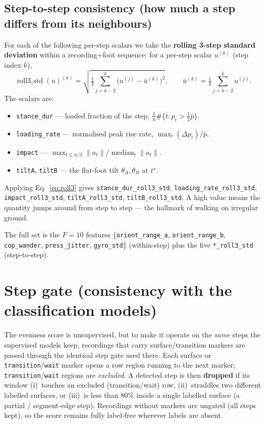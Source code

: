 \documentclass[11pt]{article}
\newcommand{\code}[1]{\texttt{#1}}
\begin{document}
\subsection{Step-to-step consistency (how much a step differs from its neighbours)}
For each of the following per-step scalars we take the \textbf{rolling 3-step standard deviation}
within a recording+foot sequence; for a per-step scalar $u^{(k)}$ (step index $k$),
\begin{equation}
\operatorname{roll3\_std}(u)^{(k)}=\sqrt{\tfrac{1}{3}\textstyle\sum_{j=k-2}^{k}\bigl(u^{(j)}-\bar u^{(k)}\bigr)^2},
\qquad \bar u^{(k)}=\tfrac13\textstyle\sum_{j=k-2}^{k}u^{(j)}.
\label{eq:roll3}
\end{equation}
The scalars are:
\begin{itemize}
  \item \code{stance_dur} --- loaded fraction of the step, $\tfrac1n\#\{t: p_t>\tfrac12\bar p\}$.
  \item \code{loading_rate} --- normalised peak rise rate, $\max_t(\Delta p_t)/\bar p$.
  \item \code{impact} --- $\max_{t\le n/3}\lVert a_t\rVert \big/ \operatorname{median}_t\lVert a_t\rVert$.
  \item \code{tiltA}, \code{tiltB} --- the flat-foot tilt $\theta_A,\theta_B$ at $t^\star$.
\end{itemize}
Applying Eq.~\eqref{eq:roll3} gives \code{stance_dur_roll3_std}, \code{loading_rate_roll3_std},
\code{impact_roll3_std}, \code{tiltA_roll3_std}, \code{tiltB_roll3_std}. A high value means the
quantity jumps around from step to step --- the hallmark of walking on irregular ground.

\medskip
\noindent The full set is the $F=10$ features
$\{$\code{orient_range_a}, \code{orient_range_b}, \code{cop_wander}, \code{press_jitter},
\code{gyro_std}$\}$ (within-step) plus the five \code{*_roll3_std} (step-to-step).

\section{Step gate (consistency with the classification models)}\label{sec:gate}
The evenness score is unsupervised, but to make it operate on the \emph{same} steps the supervised
models keep, recordings that carry surface/transition markers are passed through the identical step
gate used there. Each surface or \code{transition}/\code{wait} marker opens a row region running to
the next marker; \code{transition}/\code{wait} regions are \emph{excluded}. A detected step is then
\textbf{dropped} if its window (i)~touches an excluded (transition/wait) row, (ii)~straddles two
different labelled surfaces, or (iii)~is less than $80\%$ inside a single labelled surface
(a partial / segment-edge step). Recordings without markers are ungated (all steps kept), so the
score remains fully label-free wherever labels are absent.
\end{document}
